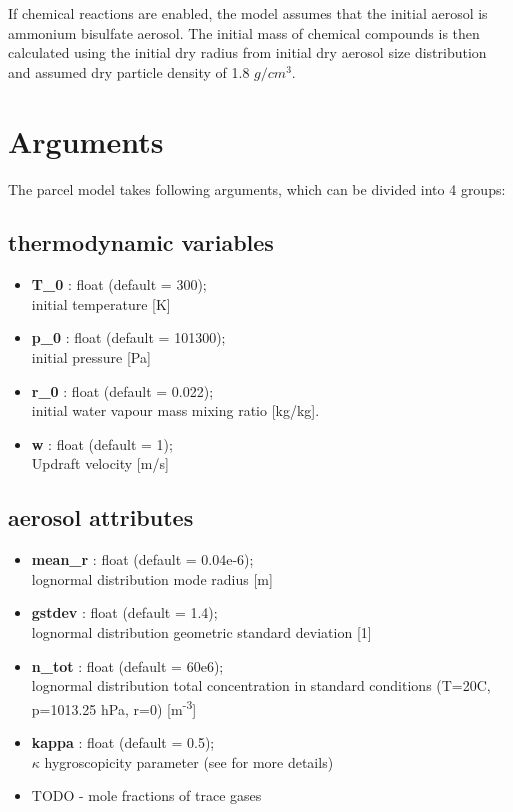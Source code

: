 \documentclass[11pt]{article}
\begin{document}
If chemical reactions are enabled, the model assumes that the initial aerosol is ammonium bisulfate aerosol.
The initial mass of chemical compounds is then calculated using the initial dry radius from initial 
  dry aerosol size distribution and assumed dry particle density of 1.8 $g/cm^3$.


\section{Arguments}

The parcel model takes following arguments, which can be divided into 4 groups:

\subsection{thermodynamic variables}

\begin{itemize}

  \item \textbf{T\_0} : float (default = 300);\\ initial temperature [K]
  \item \textbf{p\_0} : float (default = 101300);\\ initial pressure [Pa]
  \item \textbf{r\_0} : float (default = 0.022);\\ initial water vapour mass mixing ratio [kg/kg].
  \item \textbf{w} : float (default = 1);\\ Updraft velocity [m/s]

\end{itemize}

\subsection{aerosol attributes}

\begin{itemize}

  \item \textbf{mean\_r} : float (default = 0.04e-6);\\ lognormal distribution mode radius [m]
  \item \textbf{gstdev} : float (default = 1.4);\\ lognormal distribution geometric standard deviation [1]
  \item \textbf{n\_tot} : float (default = 60e6);\\ lognormal distribution total concentration in standard conditions 
                               (T=20C, p=1013.25 hPa, r=0) [m\textsuperscript{-3}]
  \item \textbf{kappa} : float (default = 0.5);\\ $\kappa$ hygroscopicity parameter (see \citep{Petters_et_al_2007} for more details)
  \item{TODO - mole fractions of trace gases}

\end{itemize}
\end{document}
